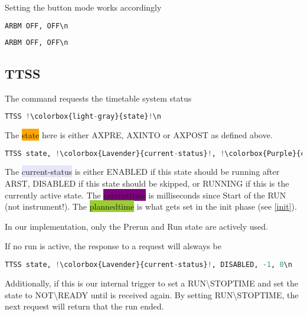 \documentclass[]{scrartcl}
\begin{document}
Setting the button mode works accordingly
\begin{lstlisting}[language=Python,escapechar=!,caption=Request (AIC$\rightarrow{}$Instrument),breaklines=true,showspaces=true]
ARBM OFF, OFF\n
\end{lstlisting}
\begin{lstlisting}[language=Python,escapechar=!,caption=Response (Instrument$\rightarrow{}$AIC) ,breaklines=true,showspaces=true]
ARBM OFF, OFF\n
\end{lstlisting}

	\subsection{TTSS}
	The  command requests the timetable system status
\begin{lstlisting}[language=Python,escapechar=!,caption=Request (AIC$\rightarrow{}$Instrument),breaklines=true,showspaces=true]
TTSS !\colorbox{light-gray}{state}!\n
\end{lstlisting}
The \colorbox{Orange}{state} here is either AXPRE, AXINTO or AXPOST as defined above.
\begin{lstlisting}[language=Python,escapechar=!,caption=Response (Instrument$\rightarrow{}$AIC) ,breaklines=true,showspaces=true]
TTSS state, !\colorbox{Lavender}{current-status}!, !\colorbox{Purple}{currenttime}!, !\colorbox{YellowGreen}{plannedtime}!\n
\end{lstlisting}
The \colorbox{Lavender}{current-status} is either ENABLED if this state should be running after ARST, DISABLED if this state should be skipped, or RUNNING if this is the currently active state.
The \colorbox{Purple}{currenttime} is milliseconds since Start of the RUN (not instrument!).
The \colorbox{YellowGreen}{plannedtime} is what gets set in the init phase (see \ref{init}).

In our implementation, only the Prerun and Run state are actively used.

If no run is active, the response to a request will alsways be 
\begin{lstlisting}[language=Python,escapechar=!,caption=Response (Instrument$\rightarrow{}$AIC) ,breaklines=true,showspaces=true]
TTSS state, !\colorbox{Lavender}{current-status}!, DISABLED, -1, 0\n
\end{lstlisting}

Additionally, if this is our internal trigger to set a RUN\textbackslash{}STOPTIME and set the  state to NOT\textbackslash{}READY until  is received again.
By setting RUN\textbackslash{}STOPTIME, the next  request will return that the run ended.
\end{document}
